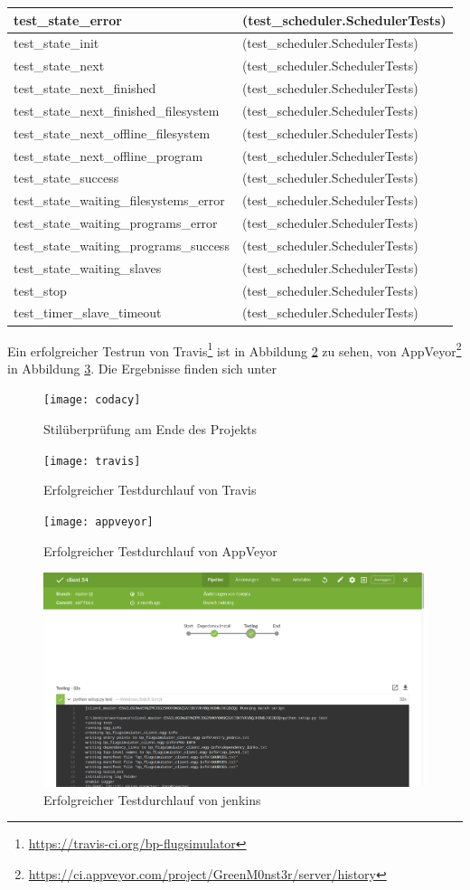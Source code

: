 \begin{longtable}{|p{10cm}|p{7cm}|}
test\_state\_error & (test\_scheduler.SchedulerTests)\\\hline
test\_state\_init & (test\_scheduler.SchedulerTests)\\\hline
test\_state\_next & (test\_scheduler.SchedulerTests)\\\hline
test\_state\_next\_finished & (test\_scheduler.SchedulerTests)\\\hline
test\_state\_next\_finished\_filesystem & (test\_scheduler.SchedulerTests)\\\hline
test\_state\_next\_offline\_filesystem & (test\_scheduler.SchedulerTests)\\\hline
test\_state\_next\_offline\_program & (test\_scheduler.SchedulerTests)\\\hline
test\_state\_success & (test\_scheduler.SchedulerTests)\\\hline
test\_state\_waiting\_filesystems\_error & (test\_scheduler.SchedulerTests)\\\hline
test\_state\_waiting\_programs\_error & (test\_scheduler.SchedulerTests)\\\hline
test\_state\_waiting\_programs\_success & (test\_scheduler.SchedulerTests)\\\hline
test\_state\_waiting\_slaves & (test\_scheduler.SchedulerTests)\\\hline
test\_stop & (test\_scheduler.SchedulerTests)\\\hline
test\_timer\_slave\_timeout & (test\_scheduler.SchedulerTests)\\\hline
\end{longtable}

Ein erfolgreicher Testrun von Travis\footnote{\url{https://travis-ci.org/bp-flugsimulator}} ist in Abbildung \ref{travis_png} zu sehen, von AppVeyor\footnote{\url{https://ci.appveyor.com/project/GreenM0nst3r/server/history}} in Abbildung \ref{appveyor_png}.
Die Ergebnisse finden sich unter 


\begin{figure}[t]
	\centering
\texttt{[image: codacy]}
	\caption{Stilüberprüfung am Ende des Projekts}
	\label{codacy_png}
\end{figure}

\begin{figure}[h]
	\centering
\texttt{[image: travis]}
	\caption{Erfolgreicher Testdurchlauf von Travis}
	\label{travis_png}
\end{figure}

\begin{figure}[h]
	\centering
\texttt{[image: appveyor]}
	\caption{Erfolgreicher Testdurchlauf von AppVeyor}
	\label{appveyor_png}
\end{figure}

\begin{figure}[h]
	\centering
\includegraphics[width=.8\textwidth]{img/jenkins.png}
	\caption{Erfolgreicher Testdurchlauf von jenkins}
	\label{jenkins_png}
\end{figure}
